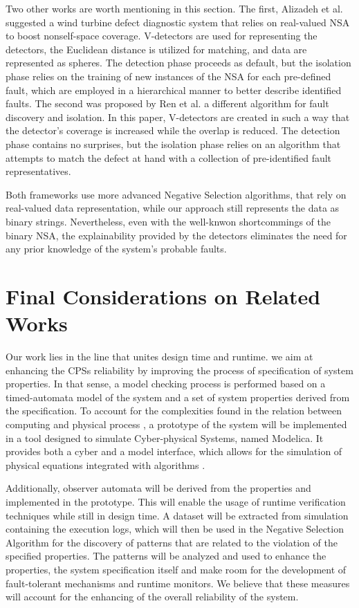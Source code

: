 Two other works are worth mentioning in this section. The first, Alizadeh et al. \cite{alizadeh2016negative} suggested a wind turbine defect diagnostic system that relies on real-valued NSA to boost nonself-space coverage. V-detectors are used for representing the detectors, the Euclidean distance is utilized for matching, and data are represented as spheres. The detection phase proceeds as default, but the isolation phase relies on the training of new instances of the NSA for each pre-defined fault, which are employed in a hierarchical manner to better describe identified faults. The second was proposed by Ren et al. \cite{ren2020novel} a different algorithm for fault discovery and isolation. In this paper, V-detectors are created in such a way that the detector's coverage is increased while the overlap is reduced. The detection phase contains no surprises, but the isolation phase relies on an algorithm that attempts to match the defect at hand with a collection of pre-identified fault representatives.

Both frameworks use more advanced Negative Selection algorithms, that rely on real-valued data representation, while our approach still represents the data as binary strings. Nevertheless, even with the well-knwon shortcommings of the binary NSA, the explainability provided by the detectors eliminates the need for any prior knowledge of the system's probable faults.

\section{Final Considerations on Related Works}

Our work lies in the line that unites design time and runtime. we aim at enhancing the CPSs reliability by improving the process of specification of system properties. In that sense, a model checking process is performed based on a timed-automata model of the system and a set of system properties derived from the specification. To account for the complexities found in the relation between computing and physical process \cite{2014PerceptionsSOTAV&VCPS}, a prototype of the system will be implemented in a tool designed to simulate Cyber-physical Systems, named Modelica. It provides both a cyber and a model interface, which allows for the simulation of physical equations integrated with algorithms \cite{fritzson2011introduction}. 

Additionally, observer automata will be derived from the properties and implemented in the prototype. This will enable the usage of runtime verification techniques while still in design time. A dataset will be extracted from simulation containing the execution logs, which will then be used in the Negative Selection Algorithm \cite{NSAResearch2021} for the discovery of patterns that are related to the violation of the specified properties. The patterns will be analyzed and used to enhance the properties, the system specification itself and make room for the development of fault-tolerant mechanisms and runtime monitors. We believe that these measures will account for the enhancing of the overall reliability of the system.
